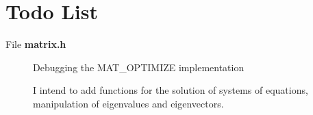 \section{Todo List}\label{todo}
\label{_todo000001}
\begin{description}
\item[File {\bf matrix.h} ]
Debugging the MAT\_\-OPTIMIZE implementation 

I intend to add functions for the solution of systems of equations, manipulation of eigenvalues and eigenvectors.\end{description}
 